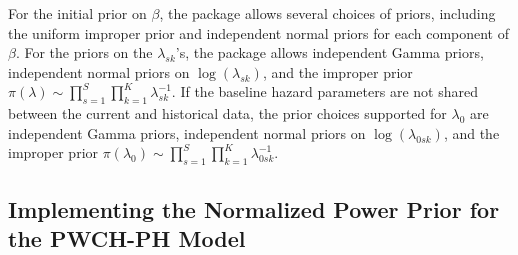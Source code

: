 For the initial prior on $\beta$, the package allows several choices of priors, including the uniform improper prior and independent normal priors for each component of $\beta$. For the priors on the $\lambda_{sk}$'s, the package allows independent Gamma priors, independent normal priors on $\log(\lambda_{sk})$, and the improper prior $\pi(\lambda) \sim \prod_{s=1}^S \prod_{k=1}^K \lambda_{sk}^{-1}.$ If the baseline hazard parameters are not shared between the current and historical data, the prior choices supported for $\lambda_0$ are independent Gamma priors, independent normal priors on $\log(\lambda_{0sk})$, and the improper prior $\pi(\lambda_0) \sim \prod_{s=1}^S \prod_{k=1}^K \lambda_{0sk}^{-1}$.

\subsection{Implementing the Normalized Power Prior for the PWCH-PH Model}

